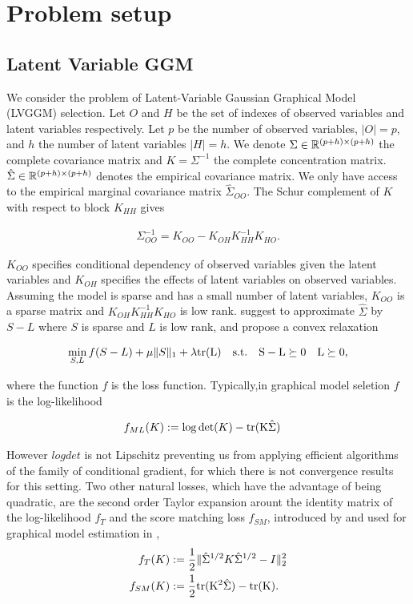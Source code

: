 \section{Problem setup}
\label{setup}

\subsection{Latent Variable GGM}
\label{sec:ggm}
We consider the problem of Latent-Variable Gaussian Graphical Model (LVGGM) selection. Let $O$ and $H$ be the set of indexes of observed variables and latent variables respectively. Let $p$ be the number of observed variables, $|O|=p$, and  $h$ the number of latent variables $|H|=h$. We denote $\Sigma\in\mathbb{R}^{(p+h)\times(p+h)}$ the complete covariance matrix and $K=\Sigma^{-1}$ the complete concentration matrix. $\hat{\Sigma}\in\mathbb{R}^{(p+h)\times(p+h)}$ denotes the empirical covariance matrix. We only have access to the empirical marginal covariance matrix $\hat{\Sigma}_{OO}$. The Schur complement of $K$ with respect to block $K_{HH}$ gives 

\begin{align}
\Sigma_{OO}^{-1} = K_{OO}-K_{OH}K_{HH}^{-1}K_{HO}.
\end{align}

$K_{OO}$ specifies conditional dependency of observed variables given the latent variables and $K_{OH}$ specifies the effects of latent variables on observed variables. Assuming the model is sparse and has a small number of latent variables, $K_{OO}$ is a sparse matrix and $K_{OH}K_{HH}^{-1}K_{HO}$ is low rank. \citet{chandrasekaran2010} suggest to approximate $\hat{\Sigma}$  by $S-L$ where $S$ is sparse and $L$ is low rank, and propose a convex relaxation

\begin{align}
\label{opt_tr}
\min_{S,L} f(S-L)+\mu\|S\|_{1}+\lambda \rm tr(L) \quad s.t. \quad S-L \succeq 0 \quad L \succeq 0,
\end{align}

where the function $f$ is the loss function. Typically,in graphical model seletion $f$ is the log-likelihood

\begin{align}
f_{ML}(K)&:=\log\det(K) - \rm tr(K\hat{\Sigma})
\end{align}

However $\textit{logdet}$ is not Lipschitz preventing us from applying efficient algorithms of the family of conditional gradient, for which there is not convergence results for this setting.  Two other natural losses, which have the advantage of being quadratic, are the second order Taylor expansion arount the identity matrix of the log-likelihood $f_{T}$ and the score matching loss $f_{SM}$, introduced by \citet{hyvarinen2005estimation} and used for graphical model estimation in \citet{lin2016estimation},
\begin{align}
f_{T}(K)&:=\frac{1}{2}\|\hat{\Sigma}^{1/2}K\hat{\Sigma}^{1/2}-I\|_2^2\\
f_{SM}(K)&:=\frac{1}{2}\rm tr(K^2 \hat{\Sigma})-\rm tr(K).
\end{align}

